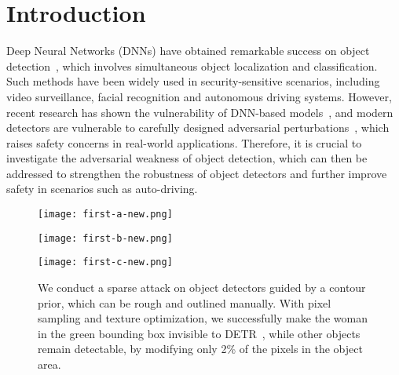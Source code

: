 \documentclass[times,twocolumn,final,authoryear]{elsarticle}
\begin{document}

\section{Introduction}
\label{sec:intro}

Deep Neural Networks (DNNs) have obtained remarkable success on object detection~\citep{ren2015faster,he2017mask,Liu_2016ssd,yolov3,carion2020detr}, which involves simultaneous object localization and classification. Such methods have been widely used in security-sensitive scenarios, including video surveillance, facial recognition and autonomous driving systems. 
However, recent research has shown the vulnerability of DNN-based models~\citep{szegedy2013intriguing,goodfellow2014explaining,madry2017towards,dong2018boosting}, and modern detectors are vulnerable to carefully designed adversarial perturbations~\citep{carlini2017adversarial,lu2017adversarial,xie2017adversarial,shen2019advspade,wu2020dpattack}, which raises safety concerns in real-world applications. Therefore, it is crucial to investigate the adversarial weakness of object detection, which can then be addressed to strengthen the robustness of object detectors and further improve safety in scenarios such as auto-driving.


\begin{figure}[t]
\centering
\begin{minipage}[]{.32\linewidth}
{               %
\texttt{[image: first-a-new.png]}}
\end{minipage}
\hspace{0in}
\begin{minipage}[]{.32\linewidth}
{
\texttt{[image: first-b-new.png]}}
\end{minipage}
\hspace{0in}
\begin{minipage}[]{.32\linewidth}
{               %
\texttt{[image: first-c-new.png]}}
\end{minipage}
\caption{We conduct a sparse attack on object detectors guided by a contour prior, which can be rough and outlined manually. With pixel sampling and texture optimization, we successfully make the woman in the green bounding box invisible to DETR~\citep{carion2020detr}, while other objects remain detectable, by modifying only 2\% of the pixels in the object area.
\vspace{-4ex}
}
\label{pic:example}
\end{figure}
\end{document}
